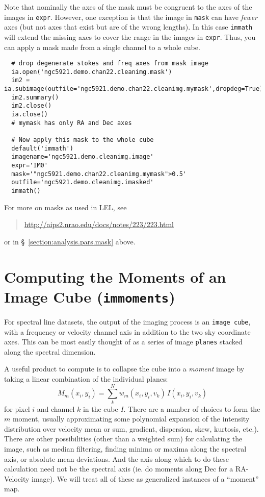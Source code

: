 Note that nominally the axes of the mask must be congruent to the axes
of the images in {\tt expr}.  However, one exception is that the image
in {\tt mask} can have {\em fewer} axes (but not axes that exist but
are of the wrong lengths).  In this case {\tt immath} will extend the
missing axes to cover the range in the images in {\tt expr}.
Thus, you can apply a mask made from a single channel to a whole cube.
\small
\begin{verbatim}
  # drop degenerate stokes and freq axes from mask image
  ia.open('ngc5921.demo.chan22.cleanimg.mask')
  im2 = ia.subimage(outfile='ngc5921.demo.chan22.cleanimg.mymask',dropdeg=True)
  im2.summary()
  im2.close()
  ia.close()
  # mymask has only RA and Dec axes

  # Now apply this mask to the whole cube
  default('immath')
  imagename='ngc5921.demo.cleanimg.image'
  expr='IM0'
  mask='"ngc5921.demo.chan22.cleanimg.mymask">0.5'
  outfile='ngc5921.demo.cleanimg.imasked'
  immath()
\end{verbatim}
\normalsize

For more on masks as used in LEL, see
\begin{quote}
   \url{http://aips2.nrao.edu/docs/notes/223/223.html}
\end{quote}
or in \S~\ref{section:analysis.pars.mask} above.

\section{Computing the Moments of an Image Cube ({\tt immoments})}
\label{section:analysis.moments}

For spectral line datasets, the output of the imaging process is an
{\tt image cube}, with a frequency or velocity channel axis in
addition to the two sky coordinate axes.  This can be most easily
thought of as a series of image {\tt planes} stacked along the
spectral dimension.

A useful product to compute is to collapse the cube into a 
{\it moment} image by taking a linear combination of the individual
planes:
\begin{equation}
   M_m(x_i,y_i) = \sum_k^N w_m(x_i,y_i,v_k)\,I(x_i,y_i,v_k)
\end{equation}
for pixel $i$ and channel $k$ in the cube $I$.  There are a number
of choices to form the $m$ moment, usually approximating some
polynomial expansion of the intensity distribution over velocity
mean or sum, gradient, dispersion, skew, kurtosis, etc.).  There
are other possibilities (other than a weighted sum) for calculating
the image, such as median filtering, finding minima or maxima along
the spectral axis, or absolute mean deviations.  And the axis along
which to do these calculation need not be the spectral axis (ie.
do moments along Dec for a RA-Velocity image).  We will treat all
of these as generalized instances of a ``moment'' map.


